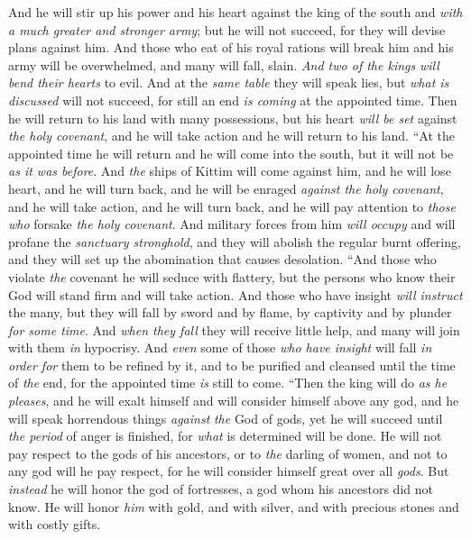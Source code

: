 \begin{biblechapter}
\verse And he will stir up his power and his heart against the king of the south and \textit{with a much greater and stronger army}; but he will not succeed, for they will devise plans against him.
\verse And those who eat of his royal rations will break him and his army will be overwhelmed, and many will fall, slain.
\verse \textit{And two of the kings} \textit{will bend their hearts} to evil. And at the \textit{same table} they will speak lies, but \textit{what is discussed} will not succeed, for still an end \textit{is coming} at the appointed time.
\verse Then he will return to his land with many possessions, but his heart \textit{will be set} against \textit{the holy covenant}, and he will take action and he will return to his land.
\verse “At the appointed time he will return and he will come into the south, but it will not be \textit{as it was before}.
\verse And \textit{the} ships of Kittim will come against him, and he will lose heart, and he will turn back, and he will be enraged \textit{against the holy covenant}, and he will take action, and he will turn back, and he will pay attention to \textit{those who} forsake \textit{the holy covenant}.
\verse And military forces from him \textit{will occupy} and will profane the \textit{sanctuary stronghold}, and they will abolish the regular burnt offering, and they will set up the abomination that causes desolation.
\verse “And those who violate \textit{the} covenant he will seduce with flattery, but the persons who know their God will stand firm and will take action.
\verse And those who have insight \textit{will instruct} the many, but they will fall by sword and by flame, by captivity and by plunder \textit{for some time}.
\verse And \textit{when they fall} they will receive little help, and many will join with them \textit{in} hypocrisy.
\verse And \textit{even} some of those \textit{who have insight}﻿ will fall \textit{in order for} them to be refined by it, and to be purified and cleansed until the time of \textit{the} end, for the appointed time \textit{is} still to come.
\verse “Then the king will do \textit{as he pleases}, and he will exalt himself and will consider himself above any god, and he will speak horrendous things \textit{against} \textit{the} God of gods, yet he will succeed until \textit{the period} of anger is finished, for \textit{what} is determined will be done.
\verse He will not pay respect to the gods of his ancestors, or to \textit{the} darling of women, and not to any god will he pay respect, for he will consider himself great over all \textit{gods}.
\verse But \textit{instead} he will honor the god of fortresses, a god whom his ancestors did not know. He will honor \textit{him} with gold, and with silver, and with precious stones and with costly gifts.

\end{biblechapter}
